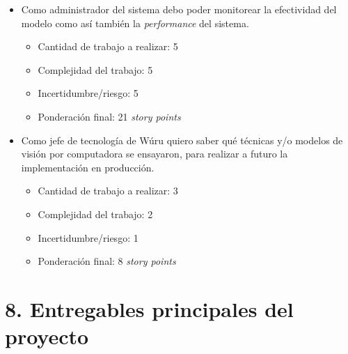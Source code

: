 \documentclass[
11pt, %
]{charter}
\begin{document}
\begin{itemize}
	\item Como administrador del sistema debo poder monitorear la efectividad del modelo como así también la \textit{performance} del sistema.
	\begin{itemize}
		\item Cantidad de trabajo a realizar: 5
		\item Complejidad del trabajo: 5
		\item Incertidumbre/riesgo: 5
		\item Ponderación final: 21 \textit{story points}
	\end{itemize}
\end{itemize}

\begin{itemize}
	\item Como jefe de tecnología de Wúru quiero saber qué técnicas y/o modelos
	de visión por computadora se ensayaron, para realizar a futuro la implementación en
	producción.
	\begin{itemize}
		\item Cantidad de trabajo a realizar: 3
		\item Complejidad del trabajo: 2
		\item Incertidumbre/riesgo: 1
		\item Ponderación final: 8 \textit{story points}
	\end{itemize}
\end{itemize}


\section{8. Entregables principales del proyecto}
\label{sec:entregables}
\end{document}
